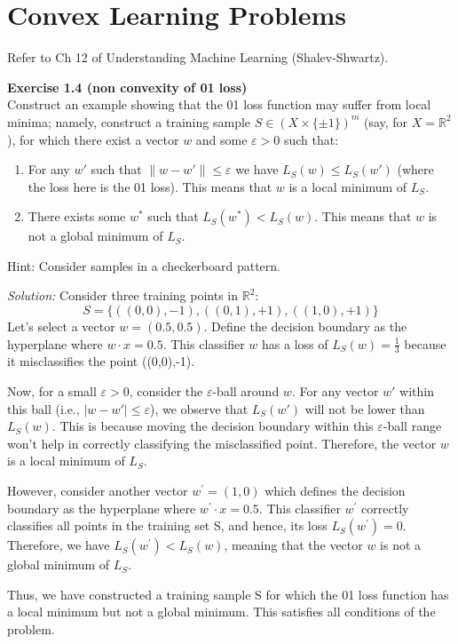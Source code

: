 \documentclass[
	10pt, %
	a4paper, %
	oneside, %
	headinclude,footinclude, %
	BCOR5mm, %
]{scrartcl}
\newenvironment{problem}[2][]
{ \begin{mdframed}[backgroundcolor=gray!20] \textbf{#1 #2} \\}
		{  \end{mdframed}}
\newenvironment{solution}
{\textit{Solution:}}
{}
\begin{document}
\section{Convex Learning Problems}
Refer to Ch 12 of Understanding Machine Learning (Shalev-Shwartz).

\begin{problem}{Exercise 1.4 (non convexity of 0\textendash{}1 loss)}
Construct an example showing that the 0\textendash{}1 loss function may suffer from local minima; namely, construct a training sample $S \in {(X \times \{\pm1\})}^m$ (say, for $X = \mathbb{R}^2$), for which there exist a vector $w$ and some $\varepsilon > 0$ such that:
\begin{enumerate}

	\item For any $w'$ such that $\|w - w'\| \leq \varepsilon$ we have $L_S (w) \leq L_S (w')$ (where the loss here is the 0\textendash{}1 loss). This means that $w$ is a local minimum of $L_S$.
	\item There exists some $w^*$ such that $L_S (w^*) < L_S (w)$. This means that $w$ is not a global minimum of $L_S$.
\end{enumerate}

Hint: Consider samples in a checkerboard pattern.
\end{problem}

\begin{solution}
	Consider three training points in $\mathbb{R}^2$:
	\[
		S = \{((0,0), -1), ((0,1), +1), ((1,0), +1)\}
	\]
	Let's select a vector $w=(0.5,0.5)$. Define the decision boundary as the hyperplane where $w \cdot x = 0.5$. This classifier $w$ has a loss of $L_S(w) = \frac{1}{3}$ because it misclassifies the point ((0,0),-1).

	Now, for a small $\varepsilon > 0$, consider the $\varepsilon$-ball around $w$. For any vector $w'$ within this ball (i.e., $|w - w'| \leq \varepsilon$), we observe that $L_S(w')$ will not be lower than $L_S(w)$. This is because moving the decision boundary within this $\varepsilon$-ball range won't help in correctly classifying the misclassified point. Therefore, the vector $w$ is a local minimum of $L_S$.

	However, consider another vector $w^\prime=(1,0)$ which defines the decision boundary as the hyperplane where $w^\prime \cdot x = 0.5$. This classifier $w^\prime$ correctly classifies all points in the training set S, and hence, its loss $L_S(w^\prime) = 0$. Therefore, we have $L_S(w^\prime) < L_S(w)$, meaning that the vector $w$ is not a global minimum of $L_S$.

	Thus, we have constructed a training sample S for which the 0\textendash{}1 loss function has a local minimum but not a global minimum. This satisfies all conditions of the problem.
\end{solution}
\end{document}
